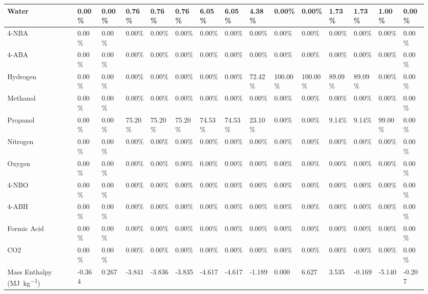 \begin{landscape}
\begin{table}[H]
\begin{tabular}{|l|l|l|l|l|l|l|l|l|l|l|l|l|l|l|}
Water                   & 0.00\%  & 0.00\%  & 0.76\%  & 0.76\%  & 0.76\%  & 6.05\%  & 6.05\%  & 4.38\%  & 0.00\%   & 0.00\%   & 1.73\%  & 1.73\%  & 1.00\%  & 0.00\%   \\ \hline
4-NBA                   & 0.00\%  & 0.00\%  & 0.00\%  & 0.00\%  & 0.00\%  & 0.00\%  & 0.00\%  & 0.00\%  & 0.00\%   & 0.00\%   & 0.00\%  & 0.00\%  & 0.00\%  & 0.00\%   \\ \hline
4-ABA                   & 0.00\%  & 0.00\%  & 0.00\%  & 0.00\%  & 0.00\%  & 0.00\%  & 0.00\%  & 0.00\%  & 0.00\%   & 0.00\%   & 0.00\%  & 0.00\%  & 0.00\%  & 0.00\%   \\ \hline
Hydrogen                & 0.00\%  & 0.00\%  & 0.00\%  & 0.00\%  & 0.00\%  & 0.00\%  & 0.00\%  & 72.42\% & 100.00\% & 100.00\% & 89.09\% & 89.09\% & 0.00\%  & 0.00\%   \\ \hline
Methanol                & 0.00\%  & 0.00\%  & 0.00\%  & 0.00\%  & 0.00\%  & 0.00\%  & 0.00\%  & 0.00\%  & 0.00\%   & 0.00\%   & 0.00\%  & 0.00\%  & 0.00\%  & 0.00\%   \\ \hline
Propanol                & 0.00\%  & 0.00\%  & 75.20\% & 75.20\% & 75.20\% & 74.53\% & 74.53\% & 23.10\% & 0.00\%   & 0.00\%   & 9.14\%  & 9.14\%  & 99.00\% & 0.00\%   \\ \hline
Nitrogen                & 0.00\%  & 0.00\%  & 0.00\%  & 0.00\%  & 0.00\%  & 0.00\%  & 0.00\%  & 0.00\%  & 0.00\%   & 0.00\%   & 0.00\%  & 0.00\%  & 0.00\%  & 0.00\%   \\ \hline
Oxygen                  & 0.00\%  & 0.00\%  & 0.00\%  & 0.00\%  & 0.00\%  & 0.00\%  & 0.00\%  & 0.00\%  & 0.00\%   & 0.00\%   & 0.00\%  & 0.00\%  & 0.00\%  & 0.00\%   \\ \hline
4-NBO                   & 0.00\%  & 0.00\%  & 0.00\%  & 0.00\%  & 0.00\%  & 0.00\%  & 0.00\%  & 0.00\%  & 0.00\%   & 0.00\%   & 0.00\%  & 0.00\%  & 0.00\%  & 0.00\%   \\ \hline
4-ABH                   & 0.00\%  & 0.00\%  & 0.00\%  & 0.00\%  & 0.00\%  & 0.00\%  & 0.00\%  & 0.00\%  & 0.00\%   & 0.00\%   & 0.00\%  & 0.00\%  & 0.00\%  & 0.00\%   \\ \hline
Formic Acid             & 0.00\%  & 0.00\%  & 0.00\%  & 0.00\%  & 0.00\%  & 0.00\%  & 0.00\%  & 0.00\%  & 0.00\%   & 0.00\%   & 0.00\%  & 0.00\%  & 0.00\%  & 0.00\%   \\ \hline
CO2                     & 0.00\%  & 0.00\%  & 0.00\%  & 0.00\%  & 0.00\%  & 0.00\%  & 0.00\%  & 0.00\%  & 0.00\%   & 0.00\%   & 0.00\%  & 0.00\%  & 0.00\%  & 0.00\%   \\ \hline
Mass Enthalpy (\si{\mega\J\per\kg})    & -0.364  & 0.267   & -3.841  & -3.836  & -3.835  & -4.617  & -4.617  & -1.189  & 0.000    & 6.627    & 3.535   & -0.169  & -5.140  & -0.207   \\ \hline
\end{tabular}
\end{table}


\end{landscape}
